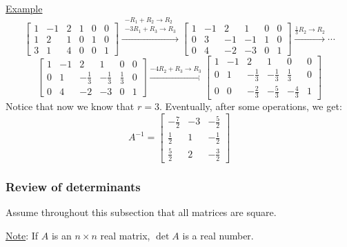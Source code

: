\documentclass{article}
\begin{document}
{\underline{Example}}
\[ \left[\begin{array}{ccc|ccc}
     1 & - 1 & 2 & 1 & 0 & 0\\
     1 & 2 & 1 & 0 & 1 & 0\\
     3 & 1 & 4 & 0 & 0 & 1
   \end{array}\right] \xrightarrow{\begin{array}{l}
     - R_1 + R_2 \rightarrow R_2\\
     - 3 R_1 + R_3 \rightarrow R_3
   \end{array}} \left[\begin{array}{ccc|ccc}
     1 & - 1 & 2 & 1 & 0 & 0\\
     0 & 3 & - 1 & - 1 & 1 & 0\\
     0 & 4 & - 2 & - 3 & 0 & 1
   \end{array}\right] \xrightarrow{\frac{1}{3} R_2 \rightarrow R_2} \cdots \]
\[ \left[\begin{array}{ccc|ccc}
     1 & - 1 & 2 & 1 & 0 & 0\\
     0 & 1 & - \frac{1}{3} & - \frac{1}{3} & \frac{1}{3} & 0\\
     0 & 4 & - 2 & - 3 & 0 & 1
   \end{array}\right] \xrightarrow{- 4 R_2 + R_3 \rightarrow R_3}
   \left[\begin{array}{ccc|ccc}
     1 & - 1 & 2 & 1 & 0 & 0\\
     0 & 1 & - \frac{1}{3} & - \frac{1}{3} & \frac{1}{3} & 0\\
     0 & 0 & - \frac{2}{3} & - \frac{5}{3} & - \frac{4}{3} & 1
   \end{array}\right] \]
Notice that now we know that $r = 3$. Eventually, after some operations, we
get:
\[ A^{- 1} = \left[\begin{array}{ccc}
     - \frac{7}{2} & - 3 & - \frac{5}{2}\\
     \frac{1}{2} & 1 & - \frac{1}{2}\\
     \frac{5}{2} & 2 & - \frac{3}{2}
   \end{array}\right] \]

\subsubsection{Review of determinants}

Assume throughout this subsection that all matrices are square.

{\underline{Note}}: If $A$ is an $n \times n$ real matrix, $\det A$ is a real
number.
\end{document}

